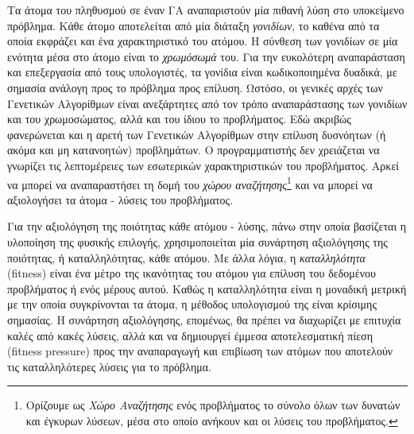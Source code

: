 Τα άτομα του πληθυσμού σε έναν ΓΑ αναπαριστούν μία πιθανή λύση στο υποκείμενο πρόβλημα. Κάθε άτομο αποτελείται από μία διάταξη \textit{γονιδίων}, το καθένα από τα οποία εκφράζει και ένα χαρακτηριστικό του ατόμου. Η σύνθεση των γονιδίων σε μία ενότητα μέσα στο άτομο είναι το \textit{χρωμόσωμά} του. Για την ευκολότερη αναπαράσταση και επεξεργασία από τους υπολογιστές, τα γονίδια είναι κωδικοποιημένα δυαδικά, με σημασία ανάλογη προς το πρόβλημα προς επίλυση. Ωστόσο, οι γενικές αρχές των Γενετικών Αλγορίθμων είναι ανεξάρτητες από τον τρόπο αναπαράστασης των γονιδίων και του χρωμοσώματος, αλλά και του ίδιου το προβλήματος. Εδώ ακριβώς φανερώνεται και η αρετή των Γενετικών Αλγορίθμων στην επίλυση δυσνόητων (ή ακόμα και μη κατανοητών) προβλημάτων. Ο προγραμματιστής δεν χρειάζεται να γνωρίζει τις λεπτομέρειες των εσωτερικών χαρακτηριστικών του προβλήματος. Αρκεί να μπορεί να αναπαραστήσει τη δομή του \textit{χώρου αναζήτησης}\footnote{Ορίζουμε ως \emph{Χώρο Αναζήτησης} ενός προβλήματος το σύνολο όλων των δυνατών και έγκυρων λύσεων, μέσα στο οποίο ανήκουν και οι λύσεις του προβλήματος.} και να μπορεί να αξιολογήσει τα άτομα - λύσεις του προβλήματος.


Για την αξιολόγηση της ποιότητας κάθε ατόμου - λύσης, πάνω στην οποία βασίζεται η υλοποίηση της φυσικής επιλογής, χρησιμοποιείται μία συνάρτηση αξιολόγησης της ποιότητας, ή καταλληλότητας, κάθε ατόμου. Με άλλα λόγια, η \textit{καταλληλότητα} (fitness) είναι ένα μέτρο της ικανότητας του ατόμου για επίλυση του δεδομένου προβλήματος ή ενός μέρους αυτού. Καθώς η καταλληλότητα είναι η μοναδική μετρική με την οποία συγκρίνονται τα άτομα, η μέθοδος υπολογισμού της είναι κρίσιμης σημασίας. Η συνάρτηση αξιολόγησης, επομένως, θα πρέπει να διαχωρίζει με επιτυχία καλές από κακές λύσεις, αλλά και να δημιουργεί έμμεσα αποτελεσματική πίεση (fitness pressure) προς την αναπαραγωγή και επιβίωση των ατόμων που αποτελούν τις καταλληλότερες λύσεις για το πρόβλημα. 


